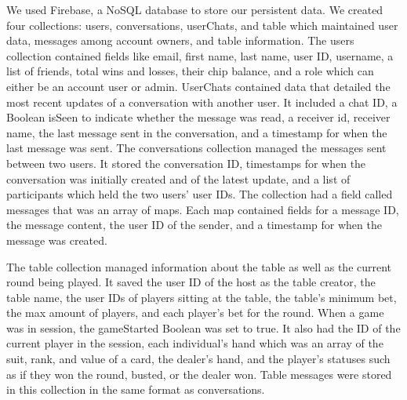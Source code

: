 We used Firebase, a NoSQL database to store our persistent data. We created four collections: users, conversations, userChats, and table which maintained user data, messages among account owners, and table information. The users collection contained fields like email, first name, last name, user ID, username, a list of friends, total wins and losses, their chip balance, and a role which can either be an account user or admin. UserChats contained data that detailed the most recent updates of a conversation with another user. It included a chat ID, a Boolean isSeen to indicate whether the message was read, a receiver id, receiver name, the last message sent in the conversation, and a timestamp for when the last message was sent. The conversations collection managed the messages sent between two users. It stored the conversation ID, timestamps for when the conversation was initially created and of the latest update, and a list of participants which held the two users’ user IDs. The collection had a field called messages that was an array of maps. Each map contained fields for a message ID, the message content, the user ID of the sender, and a timestamp for when the message was created.

 The table collection managed information about the table as well as the current round being played. It saved the user ID of the host as the table creator, the table name, the user IDs of players sitting at the table, the table’s minimum bet, the max amount of players, and each player’s bet for the round. When a game was in session, the gameStarted Boolean was set to true. It also had the ID of the current player in the session, each individual’s hand which was an array of the suit, rank, and value of a card, the dealer’s hand, and the player’s statuses such as if they won the round, busted, or the dealer won. Table messages were stored in this collection in the same format as conversations.

 \clearpage
